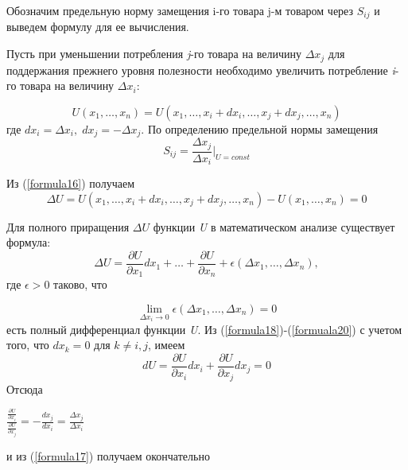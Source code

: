 \documentclass[12pt, 4paper]{book}
\begin{document}
{\par
Обозначим предельную норму замещения i-го товара j-м товаром через $S_{ij}$ и выведем формулу для ее вычисления.

\par
Пусть при уменьшении потребления \textit{j}-го товара на величину $\Delta x_j$ для поддержания прежнего уровня полезности необходимо увеличить потребление \textit{i}-го товара на величину $\Delta x_i$:
 
\begin{equation}
\label{formula16}
U(x_1, \dots, x_n)=U(x_1, \dots , x_i+d x_i, \dots, x_j+d x_j, \dots, x_n)
\end{equation}
где $d x_i= \Delta x_i,\; d x_j=-\Delta x_j$. По определению предельной нормы замещения
\begin{equation}
\label{formula17}
S_{ij}=\frac{\Delta x_j}{\Delta x_i}|_{U=const}
\end{equation}

\par
Из (\ref{formula16}) получаем
\begin{equation}
\label{formula18}
\Delta U = U(x_1, \dots, x_i+d x_i, \dots ,x_j+ d x_j, \dots, x_n)-U(x_1, \dots, x_n)=0
\end{equation}

Для полного приращения $\Delta U$ функции \textit{U} в математическом анализе существует формула:
\begin{equation}
\label{formula19}
\Delta U = \frac{\partial U}{\partial x_1}d x_1 + \dots + \frac{\partial U} {\partial x_n} + \epsilon (\Delta x_1, \dots, \Delta x_n),
\end{equation}
где $\epsilon > 0 $ таково, что

\begin{equation}
\label{formuala20}
\lim\limits_{\Delta x_i \rightarrow 0} \epsilon (\Delta x_1, \dots,\Delta x_n)=0
\end{equation}
есть полный дифференциал функции \textit{U}. Из (\ref{formula18})-(\ref{formuala20}) с учетом того, что $d x_k =0 $ для $k \neq i,j$, имеем 
\begin{equation*}
dU= \frac{\partial U}{\partial x_i} d x_i + \frac{\partial U}{\partial x_j}d x_j =0
\end{equation*}
Отсюда 
\begin{center}
$\frac{\frac{\partial U}{\partial x_i}}{\frac{\partial U}{\partial x_j}}= -\frac{d x_j}{d x_i}=\frac{\Delta x_j}{\Delta x_i}$
\end{center}
и из (\ref{formula17}) получаем окончательно 

}
\end{document}
